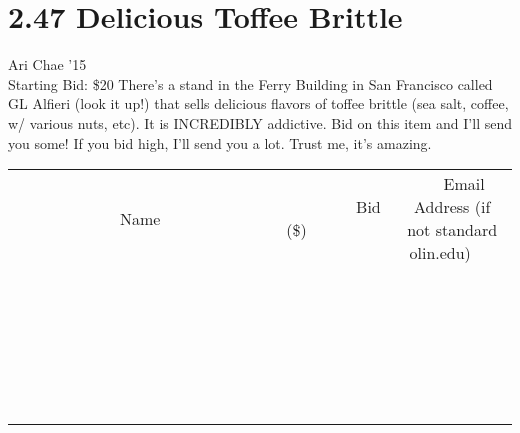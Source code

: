 \documentclass[11pt]{article}
\begin{document}
\section*{2.47 Delicious Toffee Brittle}
Ari Chae '15
\\
Starting Bid: \$20
\newline
There's a stand in the Ferry Building in San Francisco called GL Alfieri (look it up!) that sells delicious flavors of toffee brittle (sea salt, coffee, w/ various nuts, etc). It is INCREDIBLY addictive. Bid on this item and I'll send you some! If you bid high, I'll send you a lot. Trust me, it's amazing.
\\[6ex]
\begin{tabular}{c c c}
~~~~~~~~~~~~~Name~~~~~~~~~~~~~ & ~~~~~~~~~Bid (\$)~~~~~~~~~  & ~~~Email Address (if not standard olin.edu)~~~\\
 & & \\
\hline
 & & \\
\hline
 & & \\
\hline
 & & \\
\hline
 & & \\
\hline
 & & \\
\hline
 & & \\
\hline
 & & \\
\hline
 & & \\
\hline
 & & \\
\hline
 & & \\
\hline
 & & \\
\hline
 & & \\
\hline
 & & \\
\hline
 & & \\
\hline
 & & \\
\hline
 & & \\
\hline
 & & \\
\hline
 & & \\
\hline
 & & \\
\hline
 & & \\
\hline
 & & \\
\hline
 & & \\
\hline
 & & \\
\hline
 & & \\
\hline
 & & \\
\hline
\end{tabular}
\newpage
\end{document}
